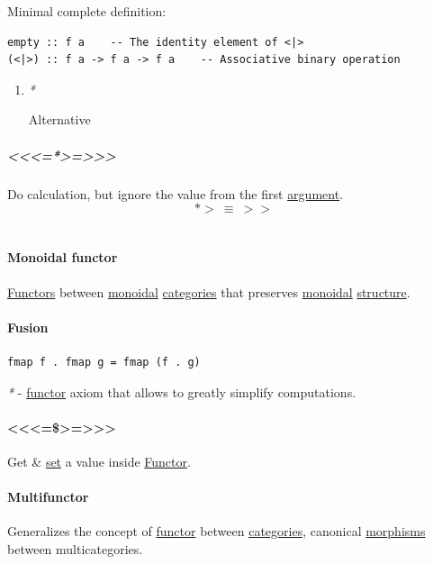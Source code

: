 \documentclass[11pt]{article}
\begin{document}
Minimal complete definition:\\
\begin{verbatim}
empty :: f a    -- The identity element of <|>
(<|>) :: f a -> f a -> f a    -- Associative binary operation
\end{verbatim}

\begin{enumerate}
\item \emph{*}
\label{sec:org4e50f0b}

\label{orgabbc1e9}Alternative\\
\end{enumerate}

\subparagraph{<<<=*>=>>>}
\label{sec:org43e3142}
Do calculation, but ignore the value from the first \hyperref[orga6b7e97]{argument}.\\

$$ *> \ \equiv \ >> $$\\

\paragraph{\label{orgf14eb83}Monoidal functor}
\label{sec:org0e09098}
\hyperref[orgdd21ed6]{Functors} between \hyperref[orgac4647e]{monoidal} \hyperref[org2f49b91]{categories} that preserves \hyperref[orgac4647e]{monoidal} \hyperref[org8051f61]{structure}.\\

\paragraph{\label{org738c534}Fusion}
\label{sec:orgc1b874a}
\begin{verbatim}
fmap f . fmap g = fmap (f . g)
\end{verbatim}

\emph{*} - \hyperref[orgf2f6841]{functor} axiom that allows to greatly simplify computations.\\

\paragraph{<<<=\$>=>>>}
\label{sec:orgdff85e4}
Get \& \hyperref[org1faf06d]{set} a value inside \hyperref[orgf2f6841]{Functor}.\\

\paragraph{\label{org59a2f95}Multifunctor}
\label{sec:orgcf71dcc}
Generalizes the concept of \hyperref[orgf2f6841]{functor} between \hyperref[org2f49b91]{categories}, canonical \hyperref[org6c2fa5c]{morphisms} between multicategories.\\
\end{document}
